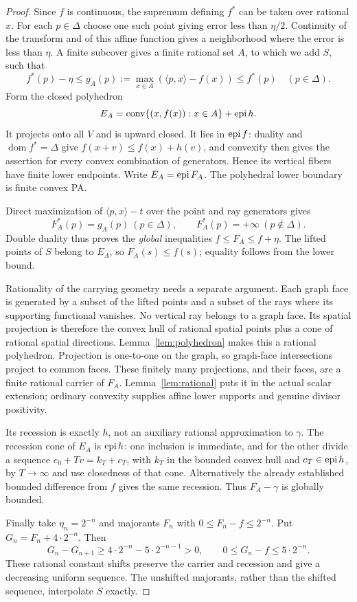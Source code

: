 \documentclass[11pt]{article}
\theoremstyle{definition}\newtheorem{definition}[theorem]{Definition}
\theoremstyle{remark}\newtheorem{remark}[theorem]{Remark}
\newcommand{\conv}{\operatorname{conv}}\newcommand{\cone}{\operatorname{cone}}
\begin{document}
\begin{proof}
Since $f$ is continuous, the supremum defining $f^*$ can be taken over rational $x$. For each $p\in\Delta$ choose one such point giving error less than $\eta/2$. Continuity of the transform and of this affine function gives a neighborhood where the error is less than $\eta$. A finite subcover gives a finite rational set $A$, to which we add $S$, such that
\[
 f^*(p)-\eta\leq g_A(p):=\max_{x\in A}(\langle p,x\rangle-f(x))\leq f^*(p)
 \quad(p\in\Delta).
\]
Form the closed polyhedron
\[
 E_A=\conv\{(x,f(x)):x\in A\}+\epi h.
\]
It projects onto all $V$ and is upward closed. It lies in $\operatorname{epi} f$: duality and $\operatorname{dom}f^*=\Delta$ give $f(x+v)\leq f(x)+h(v)$, and convexity then gives the assertion for every convex combination of generators. Hence its vertical fibers have finite lower endpoints. Write $E_A=\operatorname{epi} F_A$. The polyhedral lower boundary is finite convex PA.

Direct maximization of $\langle p,x\rangle-t$ over the point and ray generators gives
\[
 F_A^*(p)=g_A(p)\ (p\in\Delta),\qquad F_A^*(p)=+\infty\ (p\notin\Delta).
\]
Double duality thus proves the \emph{global} inequalities $f\leq F_A\leq f+\eta$. The lifted points of $S$ belong to $E_A$, so $F_A(s)\leq f(s)$; equality follows from the lower bound.

Rationality of the carrying geometry needs a separate argument. Each graph face is generated by a subset of the lifted points and a subset of the rays where its supporting functional vanishes. No vertical ray belongs to a graph face. Its spatial projection is therefore the convex hull of rational spatial points plus a cone of rational spatial directions. Lemma~\ref{lem:polyhedron} makes this a rational polyhedron. Projection is one-to-one on the graph, so graph-face intersections project to common faces. These finitely many projections, and their faces, are a finite rational carrier of $F_A$. Lemma~\ref{lem:rational} puts it in the actual scalar extension; ordinary convexity supplies affine lower supports and genuine divisor positivity.

Its recession is exactly $h$, not an auxiliary rational approximation to $\gamma$. The recession cone of $E_A$ is $\operatorname{epi} h$: one inclusion is immediate, and for the other divide a sequence $e_0+T v=k_T+c_T$, with $k_T$ in the bounded convex hull and $c_T\in\operatorname{epi} h$, by $T\to\infty$ and use closedness of that cone. Alternatively the already established bounded difference from $f$ gives the same recession. Thus $F_A-\gamma$ is globally bounded.

Finally take $\eta_n=2^{-n}$ and majorants $F_n$ with $0\leq F_n-f\leq2^{-n}$. Put $G_n=F_n+4\cdot2^{-n}$. Then
\[
 G_n-G_{n+1}\geq4\cdot2^{-n}-5\cdot2^{-n-1}>0,
 \qquad0\leq G_n-f\leq5\cdot2^{-n}.
\]
These rational constant shifts preserve the carrier and recession and give a decreasing uniform sequence. The unshifted majorants, rather than the shifted sequence, interpolate $S$ exactly.
\end{proof}
\end{document}
